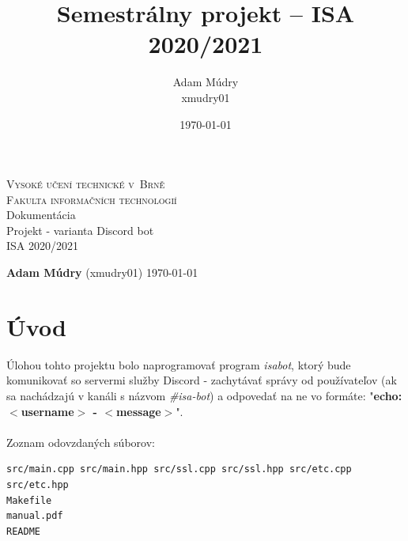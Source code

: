 \documentclass[a4paper,12pt]{article}
\author{Adam Múdry \\ xmudry01}
\date{\today}
\title{\Large\bf Semestrálny projekt -- ISA 2020/2021}
\begin{document}
\begin{titlepage}
\begin{center}
\vspace*{+3cm}
\Huge
\textsc{Vysoké učení technické v~Brně\\
\huge Fakulta informačních technologií}\\ 
\huge Dokumentácia\\Projekt - varianta Discord bot\\ISA 2020/2021\\
\end{center}


{\bf\large Adam Múdry} {\large (xmudry01)} \hfill {\large \today}

\thispagestyle{empty}
\setcounter{page}{0}
\end{titlepage}
\newpage

\tableofcontents

\newpage
\section{Úvod}
Úlohou tohto projektu bolo naprogramovať program \textit{isabot}, ktorý bude komunikovať so servermi služby Discord - zachytávať správy od používateľov (ak sa nachádzajú v kanáli s názvom \textit{\#isa-bot}) a odpovedať na ne vo formáte: "\textbf{echo: $<$username$>$ - $<$message$>$}".
\\
\\
Zoznam odovzdaných súborov: 
\begin{lstlisting}
src/main.cpp src/main.hpp src/ssl.cpp src/ssl.hpp src/etc.cpp src/etc.hpp
Makefile
manual.pdf
README
\end{lstlisting}
\end{document}
